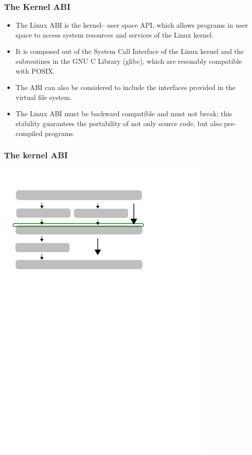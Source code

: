 \documentclass{beamer}
\begin{document}
\begin{frame}
\frametitle{The Kernel ABI}
\begin{itemize}
	\item The Linux ABI is the kernel-–user space API, which allows programs in user space to access system resources and services of the Linux kernel.
	\item It is composed out of the System Call Interface of the Linux kernel and the subroutines in the GNU C Library (glibc), which are resonably compatible with POSIX.
	\item The ABI can also be considered to include the interfaces provided in the virtual file system. 

	\item The Linux ABI must be backward compatible and must not break; this stability guarantees the portability of not only source code, but also pre-compiled programs. 
\end{itemize}
\end{frame}

\begin{frame}
\frametitle{The kernel ABI}
\begin{center}
	\includegraphics[width=0.8\textwidth]{media/kernel}
\end{center}
\end{frame}
\end{document}
